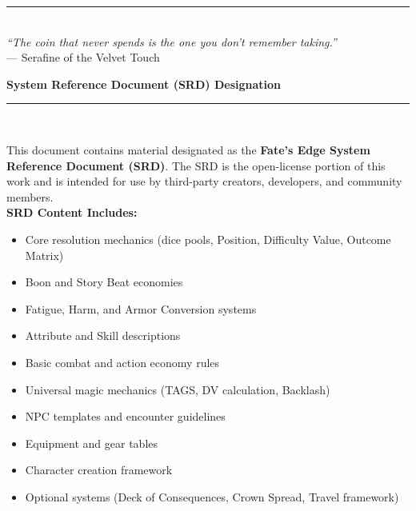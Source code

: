 \begin{center}
  \vspace{0.3in}
  \rule{0.5\textwidth}{0.4pt}\\[0.2in]
  \textit{``The coin that never spends is the one you don't remember taking.''}\\[0.1in]
  --- Serafine of the Velvet Touch
\end{center}
\newpage
\cleardoublepage
\thispagestyle{empty}
\begin{center}
  \vspace*{1.5in}
  {\Large\textbf{System Reference Document (SRD) Designation}}\\[0.3in]

  \rule{0.7\textwidth}{0.4pt}\\[0.3in]

  \begin{minipage}{0.85\textwidth}
    \small
    This document contains material designated as the \textbf{Fate's Edge System Reference Document (SRD)}.
    The SRD is the open-license portion of this work and is intended for use by third-party creators,
    developers, and community members.\\[0.2in]

    \textbf{SRD Content Includes:}
    \begin{itemize}
      \item Core resolution mechanics (dice pools, Position, Difficulty Value, Outcome Matrix)
      \item Boon and Story Beat economies
      \item Fatigue, Harm, and Armor Conversion systems
      \item Attribute and Skill descriptions
      \item Basic combat and action economy rules
      \item Universal magic mechanics (TAGS, DV calculation, Backlash)
      \item NPC templates and encounter guidelines
      \item Equipment and gear tables
      \item Character creation framework
      \item Optional systems (Deck of Consequences, Crown Spread, Travel framework)
    \end{itemize}

    \vspace{0.2in}


\end{minipage}
\end{center}
